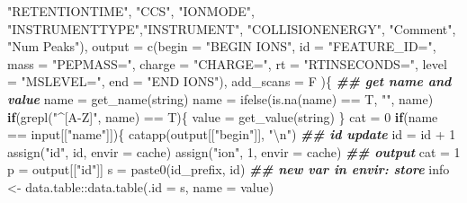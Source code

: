 \documentclass[
]{article}
\newenvironment{Shaded}{\begin{snugshade}}{\end{snugshade}}
\newcommand{\AttributeTok}[1]{\textcolor[rgb]{0.77,0.63,0.00}{#1}}
\newcommand{\ControlFlowTok}[1]{\textcolor[rgb]{0.13,0.29,0.53}{\textbf{#1}}}
\newcommand{\DecValTok}[1]{\textcolor[rgb]{0.00,0.00,0.81}{#1}}
\newcommand{\DocumentationTok}[1]{\textcolor[rgb]{0.56,0.35,0.01}{\textbf{\textit{#1}}}}
\newcommand{\FunctionTok}[1]{\textcolor[rgb]{0.00,0.00,0.00}{#1}}
\newcommand{\NormalTok}[1]{#1}
\newcommand{\OtherTok}[1]{\textcolor[rgb]{0.56,0.35,0.01}{#1}}
\newcommand{\SpecialCharTok}[1]{\textcolor[rgb]{0.00,0.00,0.00}{#1}}
\newcommand{\StringTok}[1]{\textcolor[rgb]{0.31,0.60,0.02}{#1}}
\begin{document}
\begin{Shaded}
\begin{Highlighting}[]
      \StringTok{"RETENTIONTIME"}\NormalTok{, }\StringTok{"CCS"}\NormalTok{, }\StringTok{"IONMODE"}\NormalTok{,}
      \StringTok{"INSTRUMENTTYPE"}\NormalTok{,}\StringTok{"INSTRUMENT"}\NormalTok{,}
      \StringTok{"COLLISIONENERGY"}\NormalTok{, }\StringTok{"Comment"}\NormalTok{, }\StringTok{"Num Peaks"}\NormalTok{),}
    \AttributeTok{output =} \FunctionTok{c}\NormalTok{(}\AttributeTok{begin =} \StringTok{"BEGIN IONS"}\NormalTok{,}
      \AttributeTok{id =} \StringTok{"FEATURE\_ID="}\NormalTok{,}
      \AttributeTok{mass =} \StringTok{"PEPMASS="}\NormalTok{,}
      \AttributeTok{charge =} \StringTok{"CHARGE="}\NormalTok{,}
      \AttributeTok{rt =} \StringTok{"RTINSECONDS="}\NormalTok{,}
      \AttributeTok{level =} \StringTok{"MSLEVEL="}\NormalTok{,}
      \AttributeTok{end =} \StringTok{"END IONS"}\NormalTok{),}
    \AttributeTok{add\_scans =}\NormalTok{ F}
\NormalTok{    )\{}
    \DocumentationTok{\#\# get name and value}
\NormalTok{    name }\OtherTok{=} \FunctionTok{get\_name}\NormalTok{(string)}
\NormalTok{    name }\OtherTok{=} \FunctionTok{ifelse}\NormalTok{(}\FunctionTok{is.na}\NormalTok{(name) }\SpecialCharTok{==}\NormalTok{ T, }\StringTok{""}\NormalTok{, name)}
    \ControlFlowTok{if}\NormalTok{(}\FunctionTok{grepl}\NormalTok{(}\StringTok{"\^{}[A{-}Z]"}\NormalTok{, name) }\SpecialCharTok{==}\NormalTok{ T)\{}
\NormalTok{      value }\OtherTok{=} \FunctionTok{get\_value}\NormalTok{(string)}
\NormalTok{    \}}
\NormalTok{    cat }\OtherTok{=} \DecValTok{0}
    \ControlFlowTok{if}\NormalTok{(name }\SpecialCharTok{==}\NormalTok{ input[[}\StringTok{"name"}\NormalTok{]])\{}
      \FunctionTok{catapp}\NormalTok{(output[[}\StringTok{"begin"}\NormalTok{]], }\StringTok{"}\SpecialCharTok{\textbackslash{}n}\StringTok{"}\NormalTok{)}
      \DocumentationTok{\#\# id update}
\NormalTok{      id }\OtherTok{=}\NormalTok{ id }\SpecialCharTok{+} \DecValTok{1}
      \FunctionTok{assign}\NormalTok{(}\StringTok{"id"}\NormalTok{, id, }\AttributeTok{envir =}\NormalTok{ cache)}
      \FunctionTok{assign}\NormalTok{(}\StringTok{"ion"}\NormalTok{, }\DecValTok{1}\NormalTok{, }\AttributeTok{envir =}\NormalTok{ cache)}
      \DocumentationTok{\#\# output}
\NormalTok{      cat }\OtherTok{=} \DecValTok{1}
\NormalTok{      p }\OtherTok{=}\NormalTok{ output[[}\StringTok{"id"}\NormalTok{]]}
\NormalTok{      s }\OtherTok{=} \FunctionTok{paste0}\NormalTok{(id\_prefix, id)}
      \DocumentationTok{\#\# new var in envir: store}
\NormalTok{      info }\OtherTok{\textless{}{-}}\NormalTok{ data.table}\SpecialCharTok{::}\FunctionTok{data.table}\NormalTok{(}\AttributeTok{.id =}\NormalTok{ s, }\AttributeTok{name =}\NormalTok{ value)}

\end{Highlighting}
\end{Shaded}
\end{document}
